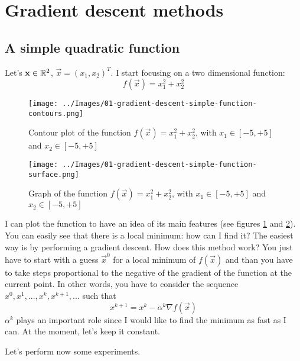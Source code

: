 \section{Gradient descent methods}
    \subsection{A simple quadratic function}
        Let's \(\mathbf{x} \in \mathbb{R}^2\), \(\vec{x} = (x_1, x_2)^T\). I start focusing on a two dimensional function:
        \[f(\vec{x}) = x_1^2 + x_2^2\]
        \begin{figure}
            \centering
            \texttt{[image: ../Images/01-gradient-descent-simple-function-contours.png]}
            \caption{Contour plot of the function \(f(\vec{x}) = x_{1}^{2} + x_{2}^{2}\), with \(x_1 \in [-5, +5]\) and \(x_2 \in [-5, +5]\)}
            \label{gradient-descent-simple-function-contours}
        \end{figure}
        \begin{figure}
            \centering
            \texttt{[image: ../Images/01-gradient-descent-simple-function-surface.png]}
            \caption{Graph of the function \(f(\vec{x}) = x_{1}^{2} + x_{2}^{2}\), with \(x_1 \in [-5, +5]\) and \(x_2 \in [-5, +5]\)}
            \label{gradient-descent-simple-function-surface}
        \end{figure}
        I can plot the function to have an idea of its main features (see figures \ref{gradient-descent-simple-function-contours} and \ref{gradient-descent-simple-function-surface}). You can easily see that there is a local minimum: how can I find it? The easiest way is by performing a gradient descent. How does this method work? You just have to start with a guess \(\vec{x}^0\) for a local minimum of \(f(\vec{x})\) and than you have to take steps proportional to the negative of the gradient of the function at the current point. In other words, you have to consider the sequence \(x^0, x^1, ..., x^k, x^{k+1}, ...\) such that
        \[x^{k+1} = x^k - \alpha^k \nabla f(\vec{x})\]
        \(\alpha^k\) plays an important role since I would like to find the minimum as fast as I can. At the moment, let's keep it constant.\par
        Let's perform now some experiments.
